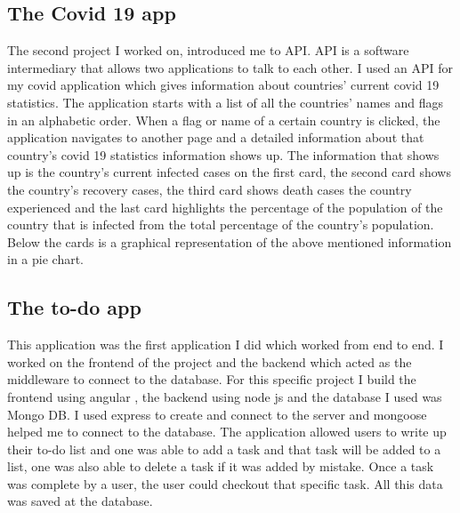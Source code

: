 \documentclass[paper=a4, fontsize=11pt]{scrartcl}
\numberwithin{equation}{section}		%
\numberwithin{figure}{section}			%
\numberwithin{table}{section}				%
\begin{document}
\subsection{ The Covid 19 app }
The second project I worked on, introduced me to API. API is a software intermediary that allows two applications to talk to each other. I used an API for my covid application which gives information about countries’ current covid 19 statistics. The application starts with a list of all the countries’ names and flags in an alphabetic order. 
When a flag or name of a certain country is clicked, the application navigates to another page and a detailed information about that country’s covid 19 statistics information shows up. The information that shows up is the country’s current infected cases on the first card, the second card shows the country’s recovery cases, the third card shows death cases the country experienced and the last card highlights the percentage of the population of the country that is infected from the total percentage of the country’s population. Below the cards is a graphical representation of the above mentioned information in a pie chart.

\subsection{ The to-do app }
This application was the first application I did which worked from end to end. I worked on the frontend of the project and the backend which acted as the middleware to connect to the database. For this specific project I build the frontend using angular , the backend using node js and the database I used was Mongo DB. I used express to create and connect to the server and mongoose helped me to connect to the database. 
The application allowed users to write up their to-do list and one was able to add a task and that task will be added to a list, one was also able to delete a task if it was added by mistake. Once a task was complete by a user, the user could checkout that specific  task. All this data was saved at the database.
\end{document}
